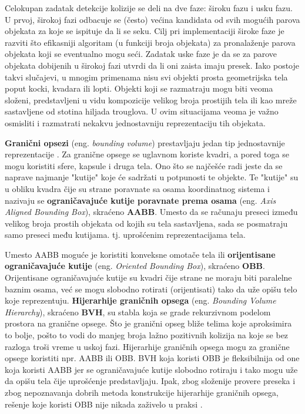 \documentclass[12pt,oneside]{memoir}
\begin{document}
Celokupan zadatak detekcije kolizije se deli na dve faze: široku fazu i usku fazu. 
U prvoj, širokoj fazi
odbacuje se (često) većina kandidata od svih mogućih parova objekata za koje se ispituje da li se seku.
Cilj pri implementaciji široke faze je razviti što efikasniji algoritam (u funkciji broja objekata) 
za pronalaženje parova objekata koji se eventualno mogu seći.
Zadatak uske faze je da se za parove objekata dobijenih u širokoj fazi utvrdi da li oni zaista imaju presek.
Iako postoje takvi slučajevi, u mnogim primenama nisu svi objekti prosta geometrijska tela poput kocki, kvadara ili lopti.
Objekti koji se razmatraju mogu biti veoma složeni, predstavljeni u vidu kompozicije velikog broja prostijih tela ili kao mreže sastavljene od stotina hiljada trouglova.
U ovim situacijama veoma je važno osmisliti i razmatrati nekakvu jednostavniju reprezentaciju tih objekata.

\textbf{Granični opsezi} (eng. {\em bounding volume}) prestavljaju jedan tip jednostavnije reprezentacije \cite{rgpdf}.
Za granične opsege se uglavnom koriste kvadri, a pored toga se mogu koristiti sfere, kapsule i druga tela.
Ono što se najčešće radi jeste da se naprave najmanje "kutije" koje će sadržati u potpunosti te objekte.
Te "kutije" su u obliku kvadra čije su strane poravnate sa osama koordinatnog sistema i nazivaju se
\textbf{ograničavajuće kutije poravnate prema osama} (eng. {\em Axis Aligned Bounding Box}), skraćeno \textbf{AABB}.
Umesto da se računaju preseci između velikog broja prostih objekata od kojih su tela sastavljena, sada se posmatraju 
samo preseci među kutijama. tj. uprošćenim reprezentacijama tela.

Umesto AABB moguće je koristiti konveksne omotače tela ili \textbf{orijentisane ograničavajuće kutije} (eng. {\em Oriented Bounding Box}), skraćeno \textbf{OBB}.
Orijentisane ograničavajuće kutije su kvadri čije strane ne moraju biti paralelne baznim osama, 
već se mogu slobodno rotirati (orijentisati) tako da uže opišu telo koje reprezentuju.
\textbf{Hijerarhije graničnih opsega} (eng. {\em Bounding Volume Hierarchy}), skraćeno \textbf{BVH}, su stabla koja se grade rekurzivnom podelom 
prostora na granične opsege. Što je granični opseg bliže telima koje aproksimira to bolje, pošto to vodi do manjeg broja 
lažno pozitivnih kolizija na koje se bez razloga troši vreme u uskoj fazi. 
Hijerarhije graničnih opsega mogu za granične opsege koristiti npr. AABB ili OBB.
BVH koja koristi OBB je fleksibilnija od one koja koristi AABB jer se ograničavajuće kutije slobodno rotiraju 
i tako mogu uže da opišu tela čije uprošćenje predstavljaju. 
Ipak, zbog složenije provere preseka i zbog nepoznavanja dobrih metoda konstrukcije hijerarhije graničnih
opsega, rešenje koje koristi OBB nije nikada zaživelo u praksi \cite{obb}. 
\end{document}
